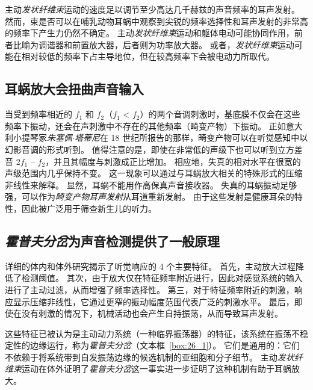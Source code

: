 主动\textit{发状纤维束}运动的速度足以调节至少高达几千赫兹的声音频率的耳声发射。
然而，束是否可以在哺乳动物耳蜗中观察到尖锐的频率选择性和耳声发射的非常高的频率下产生力仍然不确定。
主动\textit{发状纤维束}运动和躯体电动可能协同作用，前者比喻为调谐器和前置放大器，后者则为功率放大器。
或者，\textit{发状纤维束}运动可能在相对较低的频率下占主导地位，但在较高频率下会被电动力所取代。


\subsection{耳蜗放大会扭曲声音输入}


当受到频率相近的 $f_1$ 和 $f_2$（$f_1$ < $f_2$）的两个音调刺激时，基底膜不仅会在这些频率下振动，还会在声刺激中不存在的其他频率（畸变产物）下振动。
正如意大利小提琴家\textit{朱塞佩$\cdot$塔蒂尼}在 18 世纪所报告的那样，畸变产物可以在听觉感知中以幻影音调的形式听到。
值得注意的是，即使在非常低的声级下也可以听到立方差音 2$f_1$ – $f_2$，并且其幅度与刺激成正比增加。
相应地，失真的相对水平在很宽的声级范围内几乎保持不变。
这一现象可以通过与耳蜗放大相关的特殊形式的压缩非线性来解释。
显然，耳蜗不能用作高保真声音接收器。
失真的耳蜗振动足够强，可以作为\textit{畸变产物耳声发射}从耳道重新发射。
由于这些发射是健康耳朵的特性，因此被广泛用于筛查新生儿的听力。



\subsection{\textit{霍普夫分岔}为声音检测提供了一般原理}

详细的体内和体外研究揭示了听觉响应的 4 个主要特征。
首先，主动放大过程降低了检测阈值。
其次，由于放大仅在特征频率附近进行，因此对感觉系统的输入进行了主动过滤，从而增强了频率选择性。
第三，对于特征频率附近的刺激，响应显示压缩非线性，它通过更窄的振动幅度范围代表广泛的刺激水平。
最后，即使在没有刺激的情况下，机械活动也会产生自持振荡，从而导致耳声发射。


这些特征已被认为是主动动力系统（一种临界振荡器）的特征，该系统在振荡不稳定性的边缘运行，称为\textit{霍普夫分岔}（文本框~\ref{box:26_1}）。
它们是通用的：它们不依赖于将系统带到自发振荡边缘的候选机制的亚细胞和分子细节。
主动\textit{发状纤维束}运动在体外证明了\textit{霍普夫分岔}这一事实进一步证明了这种机制有助于耳蜗放大。


